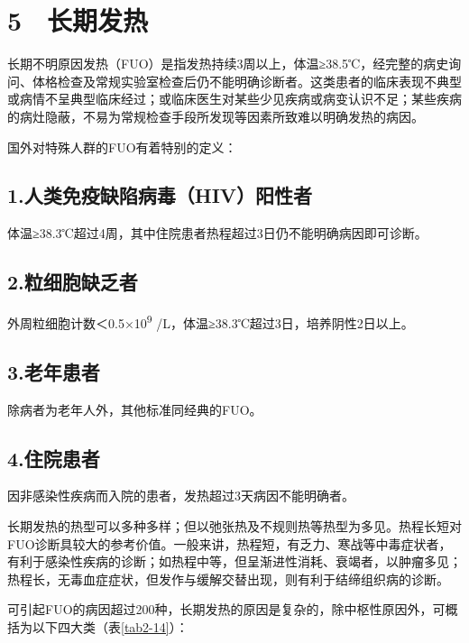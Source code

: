 \section{5　长期发热}

长期不明原因发热（FUO）是指发热持续3周以上，体温≥38.5℃，经完整的病史询问、体格检查及常规实验室检查后仍不能明确诊断者。这类患者的临床表现不典型或病情不呈典型临床经过；或临床医生对某些少见疾病或病变认识不足；某些疾病的病灶隐蔽，不易为常规检查手段所发现等因素所致难以明确发热的病因。

国外对特殊人群的FUO有着特别的定义：

\subsection{1.人类免疫缺陷病毒（HIV）阳性者}

体温≥38.3℃超过4周，其中住院患者热程超过3日仍不能明确病因即可诊断。

\subsection{2.粒细胞缺乏者}

外周粒细胞计数＜0.5×10\textsuperscript{9}
/L，体温≥38.3℃超过3日，培养阴性2日以上。

\subsection{3.老年患者}

除病者为老年人外，其他标准同经典的FUO。

\subsection{4.住院患者}

因非感染性疾病而入院的患者，发热超过3天病因不能明确者。

长期发热的热型可以多种多样；但以弛张热及不规则热等热型为多见。热程长短对FUO诊断具较大的参考价值。一般来讲，热程短，有乏力、寒战等中毒症状者，有利于感染性疾病的诊断；如热程中等，但呈渐进性消耗、衰竭者，以肿瘤多见；热程长，无毒血症症状，但发作与缓解交替出现，则有利于结缔组织病的诊断。

可引起FUO的病因超过200种，长期发热的原因是复杂的，除中枢性原因外，可概括为以下四大类（表\ref{tab2-14}）：

